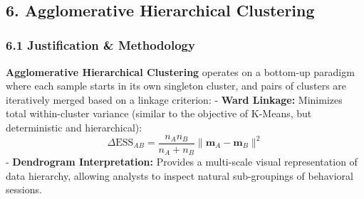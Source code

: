 \documentclass[11pt]{article}
\begin{document}
    \begin{center}
    \end{center}
    { \hspace*{\fill} \\}
    
    \subsection{6. Agglomerative Hierarchical
Clustering}\label{agglomerative-hierarchical-clustering}

\subsubsection{6.1 Justification \&
Methodology}\label{justification-methodology}

\textbf{Agglomerative Hierarchical Clustering} operates on a bottom-up
paradigm where each sample starts in its own singleton cluster, and
pairs of clusters are iteratively merged based on a linkage criterion: -
\textbf{Ward Linkage:} Minimizes total within-cluster variance (similar
to the objective of K-Means, but deterministic and hierarchical):
\[\Delta \text{ESS}_{AB} = \frac{n_A n_B}{n_A + n_B} \| \mathbf{m}_A - \mathbf{m}_B \|^2\]
- \textbf{Dendrogram Interpretation:} Provides a multi-scale visual
representation of data hierarchy, allowing analysts to inspect natural
sub-groupings of behavioral sessions.
\end{document}

